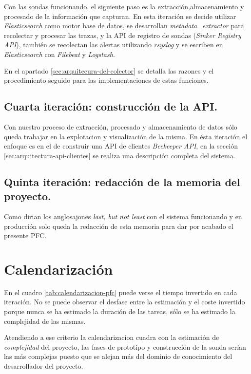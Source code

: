 Con las sondas funcionando, el siguiente paso es la extracción,almacenamiento y procesado de la información que capturan. En esta iteración
se decide utilizar \emph{Elasticsearch} como motor base de datos, se desarrollan \emph{metadata\_extractor} para recolectar y procesar las trazas, y 
la API de registro de sondas (\emph{Sinker Registry API}), también se recolectan las alertas utilizando \emph{rsyslog} y se escriben en \emph{Elasticsearch}
con \emph{Filebeat} y \emph{Logstash}.

En el apartado \ref{sec:arquitecura-del-colector} se detalla las razones y el procedimiento seguido para las implementaciones de estas funciones.

\subsection{Cuarta iteración: construcción de la API.}

Con nuestro proceso de extracción, procesado y almacenamiento de datos sólo queda trabajar en la explotacion y visualización de la misma. En ésta iteración
el enfoque es en el de construir una API de clientes \emph{Beekeeper API}, en la sección \ref{sec:arquitectura-api-clientes} se realiza
una descripción completa del sistema.

\subsection{Quinta iteración: redacción de la memoria del proyecto.}

Como dirian los anglosajones \emph{last, but not least} con el sistema funcionando y en producción solo queda la redacción de esta memoria
para dar por acabado el presente PFC.

\section{Calendarización}

En el cuadro \ref{tab:calendarizacion-pfc} puede verse el tiempo invertido en cada iteración. No se puede observar el desfase 
entre la estimación y el coste invertido porque nunca se ha estimado la duración de las tareas, sólo se ha estimado la complejidad
de las mismas.

Atendiendo a ese criterio la calendarizacion cuadra con la estimación de \emph{complejidad} del proyecto, las fases de prototipo y construcción
de la sonda serían las más complejas puesto que se alejan más del dominio de conocimiento del desarrollador del proyecto.

